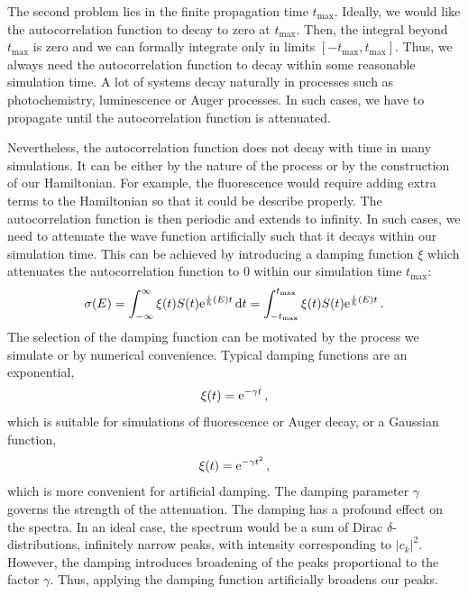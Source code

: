 The second problem lies in the finite propagation time $t_\mathrm{max}$. Ideally, we would like the autocorrelation function to decay to zero at $t_\mathrm{max}$. Then, the integral beyond $t_\mathrm{max}$ is zero and we can formally integrate only in limits $[-t_\mathrm{max}, t_\mathrm{max}]$. Thus, we always need the autocorrelation function to decay within some reasonable simulation time. A lot of systems decay naturally in processes such as photochemistry, luminescence or Auger processes. In such cases, we have to propagate until the autocorrelation function is attenuated.

Nevertheless, the autocorrelation function does not decay with time in many simulations. It can be either by the nature of the process or by the construction of our Hamiltonian. For example, the fluorescence would require adding extra terms to the Hamiltonian so that it could be describe properly. The autocorrelation function is then periodic and extends to infinity. In such cases, we need to attenuate the wave function artificially such that it decays within our simulation time. This can be achieved by introducing a damping function $\xi$ which attenuates the autocorrelation function to 0 within our simulation time $t_\mathrm{max}$:
\begin{equation}
    \sigma(E) = \int_{-\infty}^{\infty} \xi(t) S(t) \mathrm{e}^{\frac{i}{\hbar}(E)t}  \mathop{}\!\mathrm{d} t =  \int_{-t_\mathrm{max}}^{t_\mathrm{max}} \xi(t) S(t) \mathrm{e}^{\frac{i}{\hbar}(E)t}\, .
    \label{eq:damping1}
\end{equation}
The selection of the damping function can be motivated by the process we simulate or by numerical convenience.
Typical damping functions are an exponential, 
\begin{equation}
    \xi(t) = \mathrm{e}^{-\gamma t} \, ,
\end{equation}
which is suitable for simulations of fluorescence or Auger decay, or a  Gaussian function,
\begin{equation}
    \xi(t) = \mathrm{e}^{-\gamma t^2} \, ,
    \label{eq:gaussdamping}
\end{equation}
which is more convenient for artificial damping. The damping parameter $\gamma$ governs the strength of the attenuation. The damping has a profound effect on the spectra. In an ideal case, the spectrum would be a sum of Dirac $\delta$-distributions, infinitely narrow peaks, with intensity corresponding to $|c_k|^2$. However, the damping introduces broadening of the peaks proportional to the factor $\gamma$. Thus, applying the damping function artificially broadens our peaks. 

